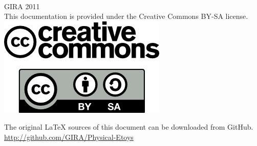\documentclass[english]{etoys-guide}
\begin{document}
\printglossaries

\clearpage
\thispagestyle{empty}
~
\vfill
\begin{center}
	GIRA 2011\\
	This documentation is provided under the Creative Commons BY-SA license.\\
	\vspace{2cm}
	\includegraphics[scale=0.5]{../../shared/images/logo_cc.png}
\end{center}

\vfill

\begin{center}
	The original LaTeX sources of this document can be downloaded from GitHub.
	\url{http://github.com/GIRA/Physical-Etoys}
\end{center}

\vfill
\end{document}
